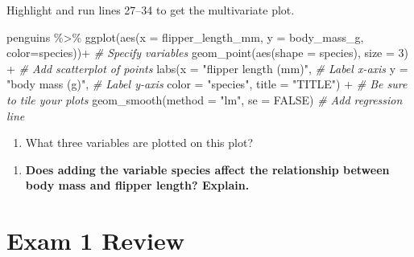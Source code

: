 \documentclass[
]{report}
\newenvironment{Shaded}{\begin{snugshade}}{\end{snugshade}}
\newcommand{\AttributeTok}[1]{\textcolor[rgb]{0.77,0.63,0.00}{#1}}
\newcommand{\CommentTok}[1]{\textcolor[rgb]{0.56,0.35,0.01}{\textit{#1}}}
\newcommand{\ConstantTok}[1]{\textcolor[rgb]{0.00,0.00,0.00}{#1}}
\newcommand{\DecValTok}[1]{\textcolor[rgb]{0.00,0.00,0.81}{#1}}
\newcommand{\FunctionTok}[1]{\textcolor[rgb]{0.00,0.00,0.00}{#1}}
\newcommand{\NormalTok}[1]{#1}
\newcommand{\SpecialCharTok}[1]{\textcolor[rgb]{0.00,0.00,0.00}{#1}}
\newcommand{\StringTok}[1]{\textcolor[rgb]{0.31,0.60,0.02}{#1}}
\providecommand{\tightlist}{%
  \setlength{\itemsep}{0pt}\setlength{\parskip}{0pt}}
\begin{document}
\vspace{0.5in}

Highlight and run lines 27--34 to get the multivariate plot.

\begin{Shaded}
\begin{Highlighting}[]
\NormalTok{penguins }\SpecialCharTok{\%\textgreater{}\%}
  \FunctionTok{ggplot}\NormalTok{(}\FunctionTok{aes}\NormalTok{(}\AttributeTok{x =}\NormalTok{ flipper\_length\_mm, }\AttributeTok{y =}\NormalTok{ body\_mass\_g, }\AttributeTok{color=}\NormalTok{species))}\SpecialCharTok{+}  \CommentTok{\# Specify variables}
  \FunctionTok{geom\_point}\NormalTok{(}\FunctionTok{aes}\NormalTok{(}\AttributeTok{shape =}\NormalTok{ species), }\AttributeTok{size =} \DecValTok{3}\NormalTok{) }\SpecialCharTok{+}  \CommentTok{\# Add scatterplot of points}
  \FunctionTok{labs}\NormalTok{(}\AttributeTok{x =} \StringTok{"flipper length (mm)"}\NormalTok{,  }\CommentTok{\# Label x{-}axis}
       \AttributeTok{y =} \StringTok{"body mass (g)"}\NormalTok{,  }\CommentTok{\# Label y{-}axis}
       \AttributeTok{color =} \StringTok{"species"}\NormalTok{,}
       \AttributeTok{title =} \StringTok{"TITLE"}\NormalTok{) }\SpecialCharTok{+} \CommentTok{\# Be sure to tile your plots}
  \FunctionTok{geom\_smooth}\NormalTok{(}\AttributeTok{method =} \StringTok{"lm"}\NormalTok{, }\AttributeTok{se =} \ConstantTok{FALSE}\NormalTok{)  }\CommentTok{\# Add regression line}
\end{Highlighting}
\end{Shaded}

\begin{enumerate}
\def\labelenumi{\arabic{enumi}.}
\setcounter{enumi}{9}
\tightlist
\item
  What three variables are plotted on this plot?
\end{enumerate}

\vspace{0.3in}

\begin{enumerate}
\def\labelenumi{\arabic{enumi}.}
\setcounter{enumi}{10}
\tightlist
\item
  \textbf{Does adding the variable species affect the relationship between body mass and flipper length? Explain.}
\end{enumerate}

\newpage

\hypertarget{exam-1-review}{%
\chapter{Exam 1 Review}\label{exam-1-review}}
\end{document}

